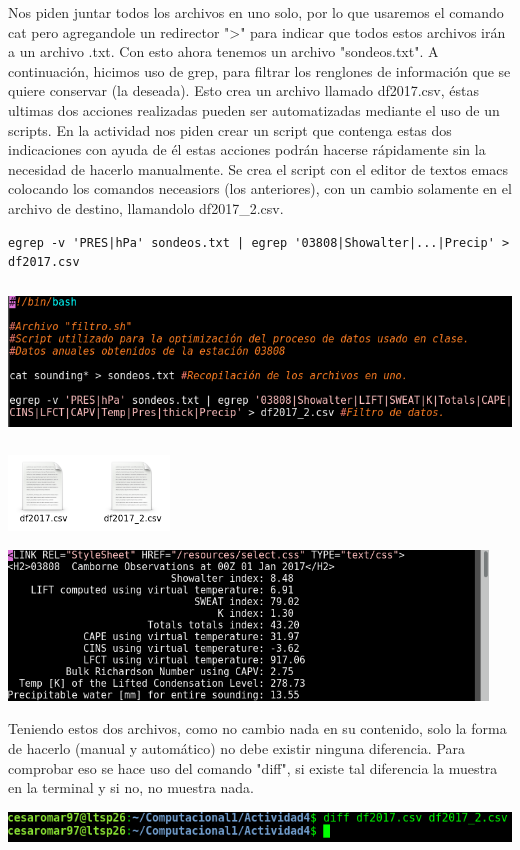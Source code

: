 \documentclass[12pt]{article}
\begin{document}
Nos piden juntar todos los archivos en uno solo, por lo que  usaremos el comando cat pero agregandole un redirector ">" para indicar que todos estos archivos irán a un archivo .txt. Con esto ahora tenemos un archivo "sondeos.txt". A continuación, hicimos uso de grep, para filtrar los renglones de información que se quiere conservar (la deseada). Esto crea un archivo llamado df2017.csv, éstas ultimas dos acciones realizadas pueden ser automatizadas mediante el uso de
un scripts. En la actividad nos piden crear un script que contenga estas dos indicaciones con ayuda de él estas acciones podrán hacerse rápidamente sin la necesidad de hacerlo manualmente. Se crea el script con el editor de textos emacs colocando los comandos neceasiors (los anteriores), con un cambio solamente en el archivo de destino, llamandolo df2017\_2.csv. \\
\begin{verbatim}
egrep -v 'PRES|hPa' sondeos.txt | egrep '03808|Showalter|...|Precip' > df2017.csv
\end{verbatim}
\begin{center}
	\includegraphics[height=4cm]{filtro.png}
\end{center}
\begin{center}
	\includegraphics[height=2cm]{archis.png}
\end{center}
\begin{center}
	\includegraphics[height=4cm]{df2.png}
\end{center}
Teniendo estos dos archivos, como no cambio nada en su contenido, solo la forma de hacerlo (manual y automático) no debe existir ninguna diferencia. Para comprobar eso se hace uso del comando "diff", si existe tal diferencia la muestra en la terminal y si no, no muestra nada.
\begin{center}
	\includegraphics[height=0.8cm]{diff.png}
\end{center}
\end{document}
